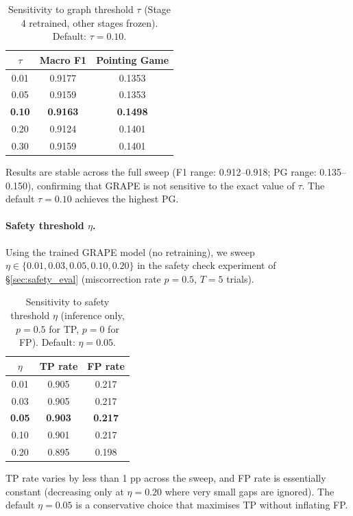 \documentclass{article}
\begin{document}
\begin{table}[h]
  \caption{Sensitivity to graph threshold $\tau$ (Stage 4 retrained, other stages frozen). Default: $\tau=0.10$.}
  \label{tab:tau_sweep}
  \centering
  \begin{tabular}{ccc}
    \toprule
    $\tau$ & Macro F1 & Pointing Game \\
    \midrule
    0.01 & 0.9177 & 0.1353 \\
    0.05 & 0.9159 & 0.1353 \\
    \textbf{0.10} & \textbf{0.9163} & \textbf{0.1498} \\
    0.20 & 0.9124 & 0.1401 \\
    0.30 & 0.9159 & 0.1401 \\
    \bottomrule
  \end{tabular}
\end{table}

Results are stable across the full sweep (F1 range: 0.912--0.918; PG range: 0.135--0.150), confirming that GRAPE is not sensitive to the exact value of $\tau$.
The default $\tau=0.10$ achieves the highest PG.

\paragraph{Safety threshold $\eta$.}
Using the trained GRAPE model (no retraining), we sweep $\eta \in \{0.01, 0.03, 0.05, 0.10, 0.20\}$ in the safety check experiment of §\ref{sec:safety_eval} (miscorrection rate $p=0.5$, $T=5$ trials).

\begin{table}[h]
  \caption{Sensitivity to safety threshold $\eta$ (inference only, $p=0.5$ for TP, $p=0$ for FP). Default: $\eta=0.05$.}
  \label{tab:eta_sweep}
  \centering
  \begin{tabular}{ccc}
    \toprule
    $\eta$ & TP rate & FP rate \\
    \midrule
    0.01 & 0.905 & 0.217 \\
    0.03 & 0.905 & 0.217 \\
    \textbf{0.05} & \textbf{0.903} & \textbf{0.217} \\
    0.10 & 0.901 & 0.217 \\
    0.20 & 0.895 & 0.198 \\
    \bottomrule
  \end{tabular}
\end{table}

TP rate varies by less than 1 pp across the sweep, and FP rate is essentially constant (decreasing only at $\eta=0.20$ where very small gaps are ignored).
The default $\eta=0.05$ is a conservative choice that maximises TP without inflating FP.
\end{document}
